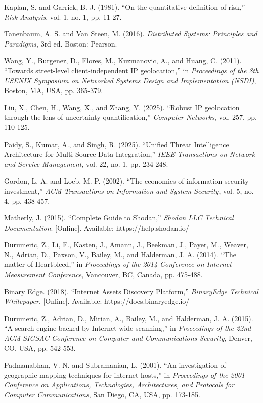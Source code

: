 \begin{thebibliography}{50}
Kaplan, S. and Garrick, B. J. (1981). ``On the quantitative definition of risk,'' \textit{Risk Analysis}, vol. 1, no. 1, pp. 11-27.

Tanenbaum, A. S. and Van Steen, M. (2016). \textit{Distributed Systems: Principles and Paradigms}, 3rd ed. Boston: Pearson.

Wang, Y., Burgener, D., Flores, M., Kuzmanovic, A., and Huang, C. (2011). ``Towards street-level client-independent IP geolocation,'' in \textit{Proceedings of the 8th USENIX Symposium on Networked Systems Design and Implementation (NSDI)}, Boston, MA, USA, pp. 365-379.

Liu, X., Chen, H., Wang, X., and Zhang, Y. (2025). ``Robust IP geolocation through the lens of uncertainty quantification,'' \textit{Computer Networks}, vol. 257, pp. 110-125.

Paidy, S., Kumar, A., and Singh, R. (2025). ``Unified Threat Intelligence Architecture for Multi-Source Data Integration,'' \textit{IEEE Transactions on Network and Service Management}, vol. 22, no. 1, pp. 234-248.

Gordon, L. A. and Loeb, M. P. (2002). ``The economics of information security investment,'' \textit{ACM Transactions on Information and System Security}, vol. 5, no. 4, pp. 438-457.

Matherly, J. (2015). ``Complete Guide to Shodan,'' \textit{Shodan LLC Technical Documentation}. [Online]. Available: https://help.shodan.io/

Durumeric, Z., Li, F., Kasten, J., Amann, J., Beekman, J., Payer, M., Weaver, N., Adrian, D., Paxson, V., Bailey, M., and Halderman, J. A. (2014). ``The matter of Heartbleed,'' in \textit{Proceedings of the 2014 Conference on Internet Measurement Conference}, Vancouver, BC, Canada, pp. 475-488.

Binary Edge. (2018). ``Internet Assets Discovery Platform,'' \textit{BinaryEdge Technical Whitepaper}. [Online]. Available: https://docs.binaryedge.io/

Durumeric, Z., Adrian, D., Mirian, A., Bailey, M., and Halderman, J. A. (2015). ``A search engine backed by Internet-wide scanning,'' in \textit{Proceedings of the 22nd ACM SIGSAC Conference on Computer and Communications Security}, Denver, CO, USA, pp. 542-553.

Padmanabhan, V. N. and Subramanian, L. (2001). ``An investigation of geographic mapping techniques for internet hosts,'' in \textit{Proceedings of the 2001 Conference on Applications, Technologies, Architectures, and Protocols for Computer Communications}, San Diego, CA, USA, pp. 173-185.


\end{thebibliography}
